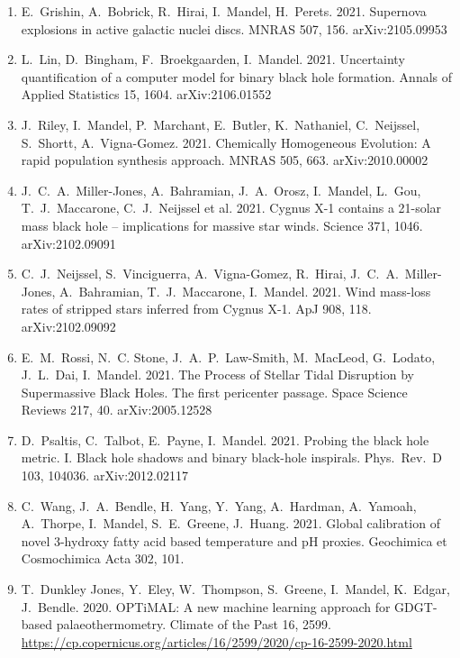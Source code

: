\documentclass[margin,line]{res}
\begin{document}
\begin{resume}
\begin{enumerate}
\item E.~Grishin, A.~Bobrick, R.~Hirai, I.~Mandel, H.~Perets. 2021.  Supernova explosions in active galactic nuclei discs.  MNRAS 507, 156.  arXiv:2105.09953

\item L.~Lin, D.~Bingham, F.~Broekgaarden, I.~Mandel. 2021. Uncertainty quantification of a computer model for binary black hole formation. Annals of Applied Statistics 15, 1604.  arXiv:2106.01552 

\item J.~Riley, I.~Mandel, P.~Marchant, E.~Butler, K.~Nathaniel, C.~Neijssel, S.~Shortt, A.~Vigna-Gomez.  2021. Chemically Homogeneous Evolution: A rapid population synthesis approach. MNRAS 505, 663.  arXiv:2010.00002

\item J.~C.~A.~Miller-Jones, A.~Bahramian, J.~A.~Orosz, I.~Mandel, L.~Gou, T.~J.~Maccarone, C.~J.~Neijssel et al.  2021.  Cygnus X-1 contains a 21-solar mass black hole -- implications for massive star winds.  Science 371, 1046. arXiv:2102.09091

\item C.~J.~Neijssel, S.~Vinciguerra, A.~Vigna-Gomez, R.~Hirai, J.~C.~A.~Miller-Jones, A.~Bahramian, T.~J.~Maccarone, I.~Mandel.  2021.  Wind mass-loss rates of stripped stars inferred from Cygnus X-1. ApJ 908, 118.  arXiv:2102.09092

\item E.~M.~Rossi, N.~C. Stone, J.~A.~P.~Law-Smith, M.~MacLeod, G.~Lodato, J.~L.~Dai, I.~Mandel.  2021.  The Process of Stellar Tidal Disruption by Supermassive Black Holes. The first pericenter passage.  Space Science Reviews 217, 40.  arXiv:2005.12528

\item D.~Psaltis, C.~Talbot, E.~Payne, I.~Mandel.  2021. Probing the black hole metric. I. Black hole shadows and binary black-hole inspirals.  Phys.~Rev.~D 103, 104036. arXiv:2012.02117

\item C.~Wang, J.~A.~Bendle,  H.~Yang, Y.~Yang, A.~Hardman, A.~Yamoah, A.~Thorpe, I.~Mandel, S.~E.~Greene, J.~Huang.  2021. Global calibration of novel 3-hydroxy fatty acid based temperature and pH proxies.  Geochimica et Cosmochimica Acta 302, 101. 

\item T.~Dunkley Jones, Y.~Eley, W.~Thompson, S.~Greene, I.~Mandel, K.~Edgar, J.~Bendle.  2020.  OPTiMAL: A new machine learning approach for GDGT-based palaeothermometry.  Climate of the Past 16, 2599.  \url{https://cp.copernicus.org/articles/16/2599/2020/cp-16-2599-2020.html}


\end{enumerate}
\end{resume}
\end{document}
